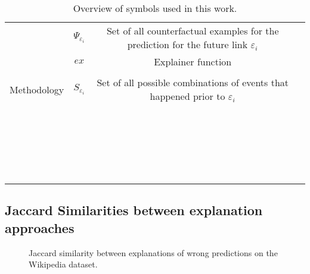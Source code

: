 \begin{table}
\begin{tabular}{lccl}
 & $\Psi_{\varepsilon_i}$& Set of all counterfactual examples for the prediction for the future link $\varepsilon_i$&\\
 & $ex$& Explainer function&\\
 & & &\\
 Methodology& $S_{\varepsilon_i}$& Set of all possible combinations of events that happened prior to $\varepsilon_i$&\\
 & & &\\
 & & &\\
 & & &\\
 & & &\\
 & & &\\
 & & &\\
 & & &\\
 & & &\\
 & & &\\
 & & &\\
 & & &\\
 & & &\\
 & & &\\
 & & &\\
 & & &\\
 & & &\\
 & & &\\
 & & &\\
 & & &\\
 & & &\\
 & & &\\
 & & &\\
    \end{tabular}
    \caption{Overview of symbols used in this work.}
    \label{t_Appendix_symbols}
\end{table}



\subsection{Jaccard Similarities between explanation approaches}
\label{s_Appendix_JaccardSimilarities}

\begin{figure}[ht]
    \centering
    
    \caption{Jaccard similarity between explanations of wrong predictions on the Wikipedia dataset.}
\end{figure}






